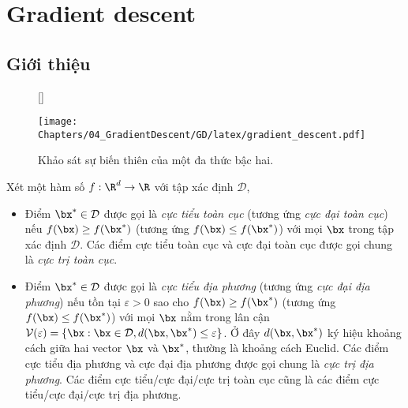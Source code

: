 \chapter{Gradient descent}
\label{cha:gradient_descent}

\section{Giới thiệu}

\begin{figure}[t]
[\FBwidth]
{\caption{
Khảo sát sự biến thiên của một đa thức bậc hai.
}
\label{fig:7_0}}
{ %
\texttt{[image: Chapters/04\_GradientDescent/GD/latex/gradient\_descent.pdf]}
}
\end{figure}


\def\mcd{\mathcal{D}}
\def\mcv{\mathcal{V}}
Xét một hàm số $f: \R^d \rightarrow \R$ với tập xác định $\mcd$,
\begin{itemize}
\item Điểm $\bx^* \in \mcd$ được gọi là \textit{cực tiểu toàn cục} (tương ứng \textit{cực đại toàn cục}) nếu $f(\bx) \geq f(\bx^*)$ (tương ứng $f(\bx) \leq f(\bx^*)$) với mọi $\bx$ trong tập xác định $\mcd$. Các điểm cực tiểu toàn cục và cực đại toàn cục được gọi chung là \textit{cực trị toàn cục}.


\item Điểm $\bx^* \in \mcd$ được gọi là \textit{cực tiểu địa phương} (tương ứng \textit{cực đại địa phương}) nếu tồn tại $\varepsilon > 0$ sao cho $f(\bx) \geq f(\bx^*)$ (tương ứng $f(\bx) \leq f(\bx^*)$) với mọi $\bx$ nằm trong lân cận $\mcv(\varepsilon) = \{\bx: \bx \in \mcd, d(\bx, \bx^*) \leq \varepsilon\}$. Ở đây $d(\bx, \bx^*)$ ký hiệu khoảng cách giữa hai vector $\bx$ và $\bx^*$, thường là khoảng cách Euclid. Các điểm cực tiểu địa phương và cực đại địa phương được gọi chung là \textit{cực trị địa phương}. Các điểm cực tiểu/cực đại/cực trị toàn cục cũng là các điểm cực tiểu/cực đại/cực trị địa phương.
\end{itemize}




